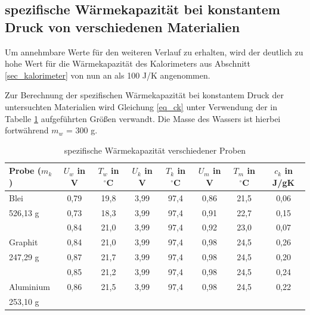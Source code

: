 \subsection[spezifische Wärmekapazität verschiedener Materialien]{spezifische Wärmekapazität bei konstantem Druck von verschiedenen Materialien}
Um annehmbare Werte für den weiteren Verlauf zu erhalten, wird der deutlich zu hohe Wert für die Wärmekapazität des Kalorimeters aus Abschnitt
\ref{sec_kalorimeter} von nun an als 100 J/K angenommen. 

Zur Berechnung der spezifischen Wärmekapazität bei konstantem Druck der untersuchten Materialien wird Gleichung \eqref{eq_ck} unter Verwendung der in Tabelle
\ref{tab_ck} aufgeführten Größen verwandt. Die Masse des Wassers ist hierbei fortwährend $m_w$ = 300 g.

\begin{table}[H]
 \begin{tabular}{l|c|c|c|c|c|c|c}
 Probe ($m_k$)& $U_w$ in V & $T_w$ in $^\circ$C & $U_k$ in V & $T_k$ in $^\circ$C & $U_m$ in V & $T_m$ in $^\circ$C & $c_k$ in J/gK\\
 \hline
Blei&	0,79&	19,8&	3,99&	97,4&	0,86&	21,5 & 0,06\\
526,13 g&	0,73&	18,3&	3,99&	97,4&	0,91&	22,7 & 0,15\\
	&0,84&	21,0&	3,99&	97,4&	0,92&	23,0 & 0,07\\
	\hline
Graphit	&0,84&	21,0&	3,99&	97,4&	0,98&	24,5 & 0,26\\
247,29	g&0,87&	21,7&	3,99&	97,4&	0,98&	24,5 & 0,20\\
	&0,85&	21,2&	3,99&	97,4&	0,98&	24,5 & 0,24\\
	\hline
Aluminium&	0,86&	21,5&	3,99&	97,4&	0,98&	24,5 & 0,22\\
253,10 g	& & & & & & &				\\ \hline

 \end{tabular}
\caption{spezifische Wärmekapazität verschiedener Proben}
\label{tab_ck}
\end{table}

